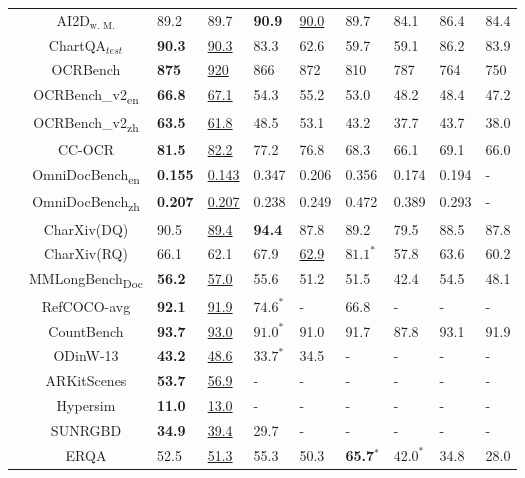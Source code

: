 {\begin{table}[htp]
\begin{adjustbox}{max width=1\textwidth}
\begin{NiceTabular}{c|c|w{c}{1cm}w{c}{1cm}|w{c}{1cm}w{c}{1cm}|w{c}{1cm}w{c}{1cm}|w{c}{1cm}w{c}{1cm}}
&AI2D$_{\text{w. M.}}$ & 89.2 & 89.7 & \textbf{90.9} & \underline{90.0} & 89.7 & 84.1 & 86.4 & 84.4 \\
&ChartQA$_{test}$ & \textbf{90.3} & \underline{90.3} & 83.3 & 62.6 & 59.7 & 59.1 & 86.2 & 83.9 \\
&OCRBench & \textbf{875} & \underline{920} & 866 & 872 & 810 & 787 & 764 & 750 \\
&OCRBench\_v2\textsubscript{\scriptsize en} & \textbf{66.8} & \underline{67.1} & 54.3 & 55.2 & 53.0 & 48.2 & 48.4 & 47.2 \\
&OCRBench\_v2\textsubscript{\scriptsize zh} & \textbf{63.5} & \underline{61.8} & 48.5 & 53.1 & 43.2 & 37.7 & 43.7 & 38.0 \\
&CC-OCR & \textbf{81.5} & \underline{82.2} & 77.2 & 76.8 & 68.3 & 66.1 & 69.1 & 66.0 \\
&OmniDocBench\textsubscript{\scriptsize en} & \textbf{0.155} & \underline{0.143} & 0.347 & 0.206 & 0.356 & 0.174 & 0.194 & - \\
&OmniDocBench\textsubscript{\scriptsize zh}& \textbf{0.207} & \underline{0.207} & 0.238 & 0.249 & 0.472 & 0.389 & 0.293 & - \\
&CharXiv(DQ) & 90.5 & \underline{89.4} & \textbf{94.4} & 87.8 & 89.2 & 79.5 & 88.5 & 87.8 \\
&CharXiv(RQ) & 66.1 & 62.1 & 67.9 & \underline{62.9} & $\mathbf{81.1^*}$ & 57.8 & 63.6 & 60.2 \\
&MMLongBench\textsubscript{\scriptsize Doc} & \textbf{56.2} & \underline{57.0} & 55.6 & 51.2 & 51.5 & 42.4 & 54.5 & 48.1 \\
\midrule
{}
&RefCOCO-avg & \textbf{92.1} & \underline{91.9} &  $74.6^*$ & - & 66.8 & - &  -   &  -   \\  
&CountBench  & \textbf{93.7} & \underline{93.0} & $91.0^*$ & 91.0 & 91.7 & 87.8 & 93.1 & 91.9 \\
&ODinW-13 & \textbf{43.2} & \underline{48.6} & $33.7^*$ & 34.5 & - & - & - & - \\
&ARKitScenes & \textbf{53.7} & \underline{56.9} & - & - & - & - &  -   &  -   \\
&Hypersim& \textbf{11.0} & \underline{13.0} & - & - & - & - &  -   &  -   \\
&SUNRGBD & \textbf{34.9} & \underline{39.4} & 29.7 & - & - & - &  -   &  -   \\
\midrule
{}
&ERQA & 52.5 & \underline{51.3} & 55.3 & 50.3 & \textbf{65.7}$^*$ & $42.0^*$ &  34.8   &  28.0   \\  

\end{NiceTabular}
\end{adjustbox}
\end{table}}
